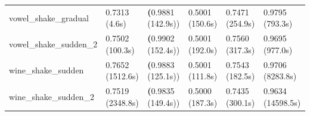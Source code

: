 \begin{tabular}{llllll}
vowel\_shake\_gradual & 0.7313 (4.6s) & \textbf(0.9881 (142.9s)) & 0.5001 (150.6s) & 0.7471 (254.9s) & 0.9795 (793.3s) \\
vowel\_shake\_sudden\_2 & 0.7502 (100.3s) & \textbf(0.9902 (152.4s)) & 0.5001 (192.0s) & 0.7560 (317.3s) & 0.9695 (977.0s) \\
wine\_shake\_sudden & 0.7652 (1512.6s) & \textbf(0.9883 (125.1s)) & 0.5001 (111.8s) & 0.7543 (182.5s) & 0.9706 (8283.8s) \\
wine\_shake\_sudden\_2 & 0.7519 (2348.8s) & \textbf(0.9835 (149.4s)) & 0.5000 (187.3s) & 0.7435 (300.1s) & 0.9634 (14598.5s) \\
\bottomrule
\end{tabular}
